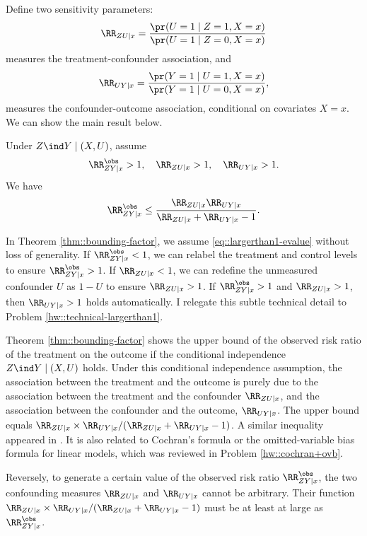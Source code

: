Define two sensitivity parameters:
$$
\RR_{ZU\mid x} = \frac{ \pr(U=1\mid Z=1,X=x) }{ \pr(U=1\mid Z=0,X=x)  } 
$$
measures the treatment-confounder association, 
and
$$
\RR_{UY\mid x} = \frac{  \pr(Y=1\mid U=1, X=x) }{  \pr(Y=1\mid U=0, X=x) },
$$
measures the confounder-outcome association, conditional on covariates $X=x$.  We can show the main result below.

\begin{theorem}\label{thm::bounding-factor}
Under $Z\ind Y\mid (X, U)$, assume 
\begin{equation}\label{eq::largerthan1-evalue}
\RR_{ZY\mid x}^\obs > 1, \quad
 \RR_{ZU\mid x} > 1,\quad 
 \RR_{UY\mid x} > 1.
\end{equation}
We have 
$$
\RR_{ZY\mid x}^\obs \leq \frac{ \RR_{ZU\mid x}  \RR_{UY\mid x} }{  \RR_{ZU\mid x} + \RR_{UY\mid x} - 1} .
$$
\end{theorem}

In Theorem \ref{thm::bounding-factor}, we assume \eqref{eq::largerthan1-evalue}  without loss of generality. If $\RR_{ZY\mid x}^\obs < 1$, we can relabel the treatment and control levels to ensure $\RR_{ZY\mid x}^\obs > 1$. If $  \RR_{ZU\mid x}  < 1$, we can redefine the unmeasured confounder $U$ as $1-U$ to ensure $   \RR_{ZU\mid x}  > 1$. If $\RR_{ZY\mid x}^\obs > 1$ and $ \RR_{ZU\mid x} > 1$, then $ \RR_{UY\mid x}  > 1$ holds automatically. I relegate this subtle technical detail to Problem \ref{hw::technical-largerthan1}. 


Theorem \ref{thm::bounding-factor} shows the upper bound of the observed risk ratio of the treatment on the outcome if the conditional independence $Z\ind Y\mid (X, U)$ holds. Under this conditional independence assumption, the association between the treatment and the outcome is purely due to the association between the treatment and the confounder $\RR_{ZU\mid x} $, and the association between the confounder and the outcome, $\RR_{UY\mid x}$. The upper bound equals $\RR_{ZU\mid x} \times  \RR_{UY\mid x} /  (\RR_{ZU\mid x} + \RR_{UY\mid x} - 1)$. 
A similar inequality appeared in \citet{lee2011bounding}. 
It is also related to Cochran's formula or the omitted-variable bias formula for linear models, which was reviewed in Problem \ref{hw::cochran+ovb}.  



Reversely, to generate a certain value of the observed risk ratio $\RR_{ZY\mid x}^\obs$, the two confounding measures $\RR_{ZU\mid x} $ and $\RR_{UY\mid x}$ cannot be arbitrary. Their function $\RR_{ZU\mid x}  \times  \RR_{UY\mid x} /  (\RR_{ZU\mid x} + \RR_{UY\mid x} - 1)$ must be at least at large as $\RR_{ZY\mid x}^\obs$. 

